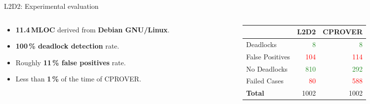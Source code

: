 \documentclass[10pt, usenames, dvipsnames, aspectratio=169]{beamer}
\begin{document}
\begin{frame}{L2D2: Experimental evaluation}
    \large

    \begin{columns}
        \hspace{-1em}

        \begin{column}{0.5 \textwidth}
            \begin{itemize}
                \item
                    \alert{\textbf{11.4\,MLOC}} derived from
                    \alert{\textbf{Debian GNU/Linux}}.
                    \vspace{.4em}

                \item
                    \alert{\textbf{100\,\% deadlock detection}} rate.
                    \vspace{.4em}

                \item
                    Roughly \alert{\textbf{11\,\% false positives}} rate.
                    \vspace{.4em}

                \item
                    Less than \alert{\textbf{1\,\%}} of the time
                    of \textsc{CPROVER}.
            \end{itemize}
        \end{column}

        \begin{column}{0.5\textwidth}
            \begin{table}
                \begin{tabular}{lrr}
                    & \textsc{\alert{\textbf{L2D2}}} & \textsc{CPROVER} \\
                    \midrule
                    Deadlocks & \textcolor{ForestGreen}{8} & \textcolor{ForestGreen}{8} \\
                    False Positives & \textcolor{Red}{104} & \textcolor{Red}{114} \\
                    No Deadlocks & \textcolor{ForestGreen}{810} & \textcolor{ForestGreen}{292} \\
                    Failed Cases & \textcolor{Red}{80} & \textcolor{Red}{588} \\
                    \bottomrule
                    \textbf{Total} & 1002 & 1002
                \end{tabular}
            \end{table}
        \end{column}
    \end{columns}
\end{frame}
\end{document}
